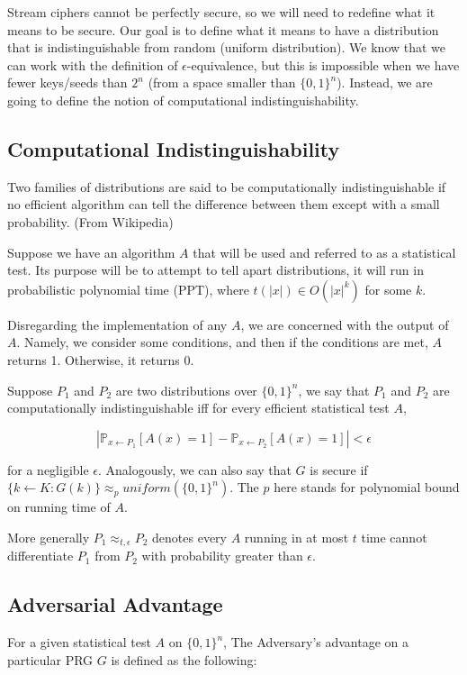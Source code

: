 \documentclass{article}
\begin{document}
\begin{multicols}{2}
Stream ciphers cannot be perfectly secure, so we will need to redefine what it means to be secure. Our goal is to define what it means to have a distribution that is indistinguishable from random (uniform distribution). We know that we can work with the definition of $\epsilon$-equivalence, but this is impossible when we have fewer keys/seeds than $2^n$ (from a space smaller than $\{0,1\}^n$). Instead, we are going to define the notion of computational indistinguishability.

\subsection {Computational Indistinguishability}

Two families of distributions are said to be computationally indistinguishable if no efficient algorithm can tell the difference between them except with a small probability. (From Wikipedia)

Suppose we have an algorithm $A$ that will be used and referred to as a statistical test. Its purpose will be to attempt to tell apart distributions, it will run in probabilistic polynomial time (PPT), where $t(|x|) \in O(|x|^k)$ for some $k$.

Disregarding the implementation of any $A$, we are concerned with the output of $A$. Namely, we consider some conditions, and then if the conditions are met, $A$ returns 1. Otherwise, it returns 0.

Suppose $P_1$ and $P_2$ are two distributions over $\{0,1\}^n$, we say that $P_1$ and $P_2$ are computationally indistinguishable iff for every efficient statistical test $A$,

$$
|\mathbb{P}_{x \leftarrow P_1}[A(x) = 1] - \mathbb{P}_{x \leftarrow P_2}[A(x) = 1]| < \epsilon
$$

for a negligible $\epsilon$. Analogously, we can also say that $G$ is secure if $\{k \leftarrow K : G(k)\} \approx_p uniform(\{0,1\}^n)$. The $p$ here stands for polynomial bound on running time of $A$.

More generally $P_1 \approx_{t,\epsilon} P_2$ denotes every $A$ running in at most $t$ time cannot differentiate $P_1$ from $P_2$ with probability greater than $\epsilon$.

\subsection {Adversarial Advantage}

For a given statistical test $A$ on $\{0,1\}^n$, The Adversary's advantage on a particular PRG $G$ is defined as the following:


\end{multicols}
\end{document}
